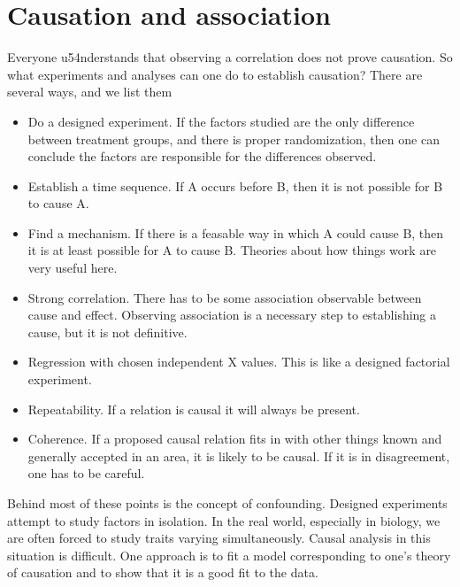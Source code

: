 \documentclass{article}
\begin{document}
\section{Causation and association}
Everyone u54nderstands that observing a correlation does not prove causation. So what experiments and analyses can one do to establish causation? There are several ways, and we list them
\begin{itemize}
\item Do a designed experiment. If the factors studied are the only difference between treatment groups, and there is proper randomization, then one can conclude the factors are responsible for the differences observed.
\item Establish a time sequence. If A occurs before B, then it is not possible for B to cause A.
\item Find a mechanism. If there is a feasable way in which A could cause B, then it is at least possible for A to cause B. Theories about how things work are very useful here.
\item  Strong correlation. There has to be some association observable between cause and effect. Observing association is a necessary step to establishing a cause, but it is not definitive.
\item Regression with chosen independent X values. This is like a designed factorial experiment. 
\item Repeatability. If a relation is causal it will always be present. 
\item Coherence. If a proposed causal relation fits in with other things known and generally accepted in an area, it is likely to be causal. If it is in disagreement, one has to be careful.
\end{itemize}
 
Behind most of these points is the concept of confounding. Designed experiments attempt to study factors in isolation. In the real world, especially in biology, we are often forced to study traits varying simultaneously.  Causal analysis in this situation  is difficult. One approach is to fit a model corresponding to one's theory of causation and to show that it is a good fit to the data. 
\end{document}
